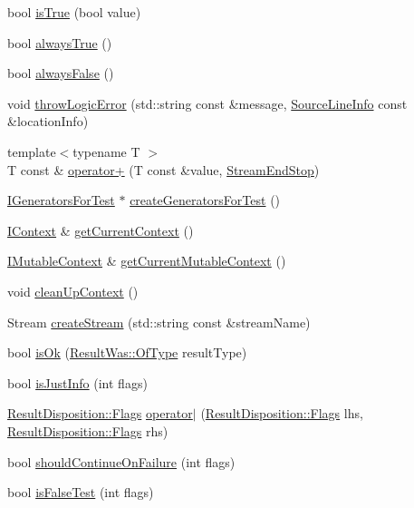 \begin{DoxyCompactItemize}
bool \hyperlink{a00117_ae3bc6c6677e64e6eaa720dc3add31852}{is\+True} (bool value)
\item 
bool \hyperlink{a00117_a129be2186a2f6546206ec52c4bf2156f}{always\+True} ()
\item 
bool \hyperlink{a00117_ad425271249dd02956a9709e78b8b2783}{always\+False} ()
\item 
void \hyperlink{a00117_a702b612f683d154c466ea8297ed4a20d}{throw\+Logic\+Error} (std\+::string const \&message, \hyperlink{a00075}{Source\+Line\+Info} const \&location\+Info)
\item 
{\footnotesize template$<$typename T $>$ }\\T const \& \hyperlink{a00117_a5e95b3c47a7618db3649dc39b0bb9004}{operator+} (T const \&value, \hyperlink{a00077}{Stream\+End\+Stop})
\item 
\hyperlink{a00036}{I\+Generators\+For\+Test} $\ast$ \hyperlink{a00117_a3d93b31e88fd01ee9e0d20757ff64eab}{create\+Generators\+For\+Test} ()
\item 
\hyperlink{a00031}{I\+Context} \& \hyperlink{a00117_ad517cca9b21deb79101e90e5508dd161}{get\+Current\+Context} ()
\item 
\hyperlink{a00037}{I\+Mutable\+Context} \& \hyperlink{a00117_af7bb0c32ab2453d2f53e92a96d15360e}{get\+Current\+Mutable\+Context} ()
\item 
void \hyperlink{a00117_ae50508f10ffc4ed873a31a4db4caea16}{clean\+Up\+Context} ()
\item 
Stream \hyperlink{a00117_ad7591011c5d99d59504ecd3384001c3e}{create\+Stream} (std\+::string const \&stream\+Name)
\item 
bool \hyperlink{a00117_a5205869c81c06d3460759cb86676ae68}{is\+Ok} (\hyperlink{a00069_a624e1ee3661fcf6094ceef1f654601ef}{Result\+Was\+::\+Of\+Type} result\+Type)
\item 
bool \hyperlink{a00117_a54b01af61673a3e1f21f31713639b180}{is\+Just\+Info} (int flags)
\item 
\hyperlink{a00068_a3396cad6e2259af326b3aae93e23e9d8}{Result\+Disposition\+::\+Flags} \hyperlink{a00117_ab32a083e442cc09f736327d2e2865999}{operator$\vert$} (\hyperlink{a00068_a3396cad6e2259af326b3aae93e23e9d8}{Result\+Disposition\+::\+Flags} lhs, \hyperlink{a00068_a3396cad6e2259af326b3aae93e23e9d8}{Result\+Disposition\+::\+Flags} rhs)
\item 
bool \hyperlink{a00117_a7f7480b15d74965459c844f0d393ed87}{should\+Continue\+On\+Failure} (int flags)
\item 
bool \hyperlink{a00117_a93ef4e3e307a2021ca0d41b32c0e54b0}{is\+False\+Test} (int flags)

\end{DoxyCompactItemize}
